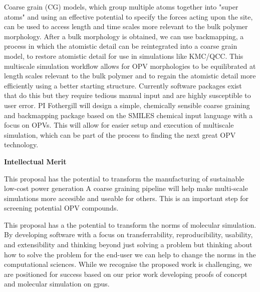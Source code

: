 Coarse grain (CG) models, which group multiple atoms together into "super atoms" and using an effective potential to specify the forces acting upon the site, can be used to access length and time scales more relevant to the bulk polymer morphology.
After a bulk morphology is obtained, we can use backmapping, a process in which the atomistic detail can be reintegrated into a coarse grain model, to restore atomistic detail for use in simulations like KMC/QCC.
This multiscale simulation workflow allows for OPV morphologies to be equilibrated at length scales relevant to the bulk polymer and to regain the atomistic detail more efficiently using a better starting structure.
Currently software packages exist that do this but they require tedious manual input and are highly susceptible to user error.
PI Fothergill will design a simple, chemically sensible coarse graining and backmapping package based on the SMILES chemical input language with a focus on OPVs.
This will allow for easier setup and execution of multiscale simulation, which can be part of the process to finding the next great OPV technology.

\begin{center}
    \textbf{Intellectual Merit}
\end{center}

This proposal has the potential to transform the manufacturing of sustainable low-cost power generation
A coarse graining pipeline will help make multi-scale simulations more accesible and useable for others. 
This is an important step for screening potential OPV compounds.

This proposal has a the potential to transform the norms of molecular simulation.
By developing software with a focus on transferrability, reproducibility, usability, and extensibility and thinking beyond just solving a problem but thinking about how to solve the problem for the end-user we can help to change the norms in the computational sciences.
While we recognise the proposed work is challenging, we are positioned for success based on our prior work developing proofs of concept and molecular simulation on gpus.

